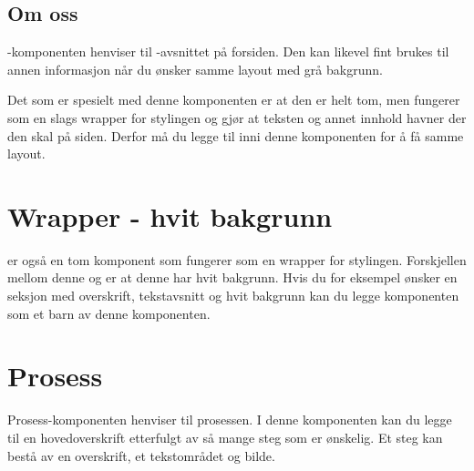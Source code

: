 \subsection{Om oss}
-komponenten henviser til -avsnittet på forsiden. Den kan likevel fint brukes til annen informasjon når du ønsker samme layout med grå bakgrunn.

Det som er spesielt med denne komponenten er at den er helt tom, men fungerer som en slags wrapper for stylingen og gjør at teksten og annet innhold havner der den skal på siden. Derfor må du legge til  inni denne komponenten for å få samme layout.

\begin{figure}[H]
    \centering
    \label{fig:cms-about-us}
\end{figure}

\section{Wrapper - hvit bakgrunn}
 er også en tom komponent som fungerer som en wrapper for stylingen. Forskjellen mellom denne og  er at denne har hvit bakgrunn. Hvis du for eksempel ønsker en seksjon med overskrift, tekstavsnitt og hvit bakgrunn kan du legge komponenten  som et barn av denne komponenten.

\section{Prosess}
Prosess-komponenten henviser til prosessen. I denne komponenten kan du legge til en hovedoverskrift etterfulgt av så mange steg som er ønskelig. Et steg kan bestå av en overskrift, et tekstområdet og bilde. 

